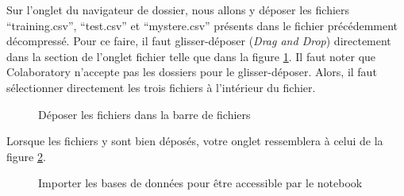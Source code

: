 \documentclass{article}
\begin{document}
Sur l'onglet du navigateur de dossier, nous allons y déposer les fichiers ``training.csv'', ``test.csv'' et ``mystere.csv'' présents dans le fichier précédemment décompressé. Pour ce faire, il faut glisser-déposer (\textit{Drag and Drop}) directement dans la section de l'onglet fichier telle que dans la figure \ref{fig:dragndrop}. Il faut noter que Colaboratory n'accepte pas les dossiers pour le glisser-déposer. Alors, il faut sélectionner directement les trois fichiers à l'intérieur du fichier.

\begin{figure}[H]
  \centering
  \caption{Déposer les fichiers dans la barre de fichiers}
  \label{fig:dragndrop}
\end{figure}

Lorsque les fichiers y sont bien déposés, votre onglet ressemblera à celui de la figure \ref{fig:upload}.

\begin{figure}[H]
  \centering
  \caption{Importer les bases de données pour être accessible par le notebook}
  \label{fig:upload}
\end{figure}
\end{document}

